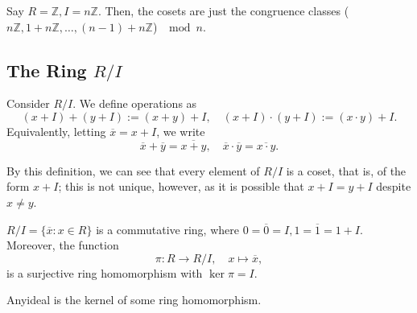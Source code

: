 \documentclass[12pt,oneside]{article}
\begin{document}
\begin{example}
  Say $R = \mathbb{Z}, I = n \mathbb{Z}$. Then, the cosets are just the congruence classes ($n \mathbb{Z}, 1 + n \mathbb{Z} , \dots, (n-1) + n \mathbb{Z}$) $\mod n$.
\end{example}

\subsection{\texorpdfstring{The Ring $R/I$}{The Ring R/I}}

\begin{definition}
  Consider \footnotemark $R / I$. We define operations as \[
  (x+I) + (y+I) := (x+y) + I, \quad (x + I) \cdot (y+I) := (x\cdot y) + I.  
  \]
  Equivalently, letting $\overline{x} = x + I$, we write \[
  \overline{x}  + \overline{y} = \overline{x+y}, \quad \overline{x} \cdot \overline{y} = \overline{x\cdot y}.
  \]

\end{definition}



\begin{remark}
  By this definition, we can see that every element of $R / I$ is a coset, that is, of the form $x + I$; this is not unique, however, as it is possible that $x + I = y + I$ despite $x \neq y$.
\end{remark}

\begin{theorem}\label{thm:rmodicommutativering}
  $R/I = \{\overline{x} : x \in R\}$ is a commutative ring, where $0 = \overline{0} = I, 1 = \overline{1} = 1 + I$. Moreover, the function \[
  \pi : R \to R /I, \quad x \mapsto \overline{x},  
  \]
  is a surjective ring homomorphism with $\ker \pi = I$.
\end{theorem}

\begin{corollary}
  Any\footnotemark ideal is the kernel of some ring homomorphism.
\end{corollary}
\end{document}
